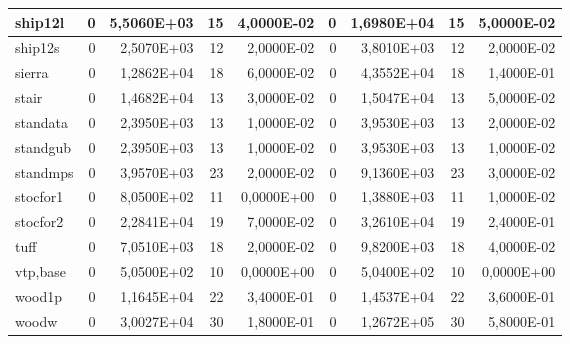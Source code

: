 \begin{tabular}{|l|r|r|r|r|r|r|r|r|}
ship12l & 0 & 5,5060E+03 & 15 & 4,0000E-02 & 0 & 1,6980E+04 & 15 & 5,0000E-02 \\ \hline
ship12s & 0 & 2,5070E+03 & 12 & 2,0000E-02 & 0 & 3,8010E+03 & 12 & 2,0000E-02 \\ \hline
sierra & 0 & 1,2862E+04 & 18 & 6,0000E-02 & 0 & 4,3552E+04 & 18 & 1,4000E-01 \\ \hline
stair & 0 & 1,4682E+04 & 13 & 3,0000E-02 & 0 & 1,5047E+04 & 13 & 5,0000E-02 \\ \hline
standata & 0 & 2,3950E+03 & 13 & 1,0000E-02 & 0 & 3,9530E+03 & 13 & 2,0000E-02 \\ \hline
standgub & 0 & 2,3950E+03 & 13 & 1,0000E-02 & 0 & 3,9530E+03 & 13 & 1,0000E-02 \\ \hline
standmps & 0 & 3,9570E+03 & 23 & 2,0000E-02 & 0 & 9,1360E+03 & 23 & 3,0000E-02 \\ \hline
stocfor1 & 0 & 8,0500E+02 & 11 & 0,0000E+00 & 0 & 1,3880E+03 & 11 & 1,0000E-02 \\ \hline
stocfor2 & 0 & 2,2841E+04 & 19 & 7,0000E-02 & 0 & 3,2610E+04 & 19 & 2,4000E-01 \\ \hline
tuff & 0 & 7,0510E+03 & 18 & 2,0000E-02 & 0 & 9,8200E+03 & 18 & 4,0000E-02 \\ \hline
vtp,base & 0 & 5,0500E+02 & 10 & 0,0000E+00 & 0 & 5,0400E+02 & 10 & 0,0000E+00 \\ \hline
wood1p & 0 & 1,1645E+04 & 22 & 3,4000E-01 & 0 & 1,4537E+04 & 22 & 3,6000E-01 \\ \hline
woodw & 0 & 3,0027E+04 & 30 & 1,8000E-01 & 0 & 1,2672E+05 & 30 & 5,8000E-01 \\ \hline
\end{tabular}
